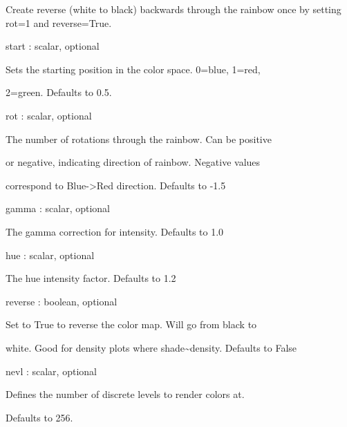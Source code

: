 \documentclass[a4paper,10pt,english]{sphinxmanual}
\begin{document}
\begin{fulllineitems}
Create reverse (white to black) backwards through the rainbow once
by setting rot=1 and reverse=True.
\begin{description}
\item[{Args:}] \leavevmode
\begin{DUlineblock}{0em}
\item[] start : scalar, optional
\item[]
\begin{DUlineblock}{\DUlineblockindent}
\item[] Sets the starting position in the color space. 0=blue, 1=red, 
\item[] 2=green. Defaults to 0.5.
\end{DUlineblock}
\item[] rot : scalar, optional
\item[]
\begin{DUlineblock}{\DUlineblockindent}
\item[] The number of rotations through the rainbow. Can be positive 
\item[]
\begin{DUlineblock}{\DUlineblockindent}
\item[] or negative, indicating direction of rainbow. Negative values
\item[] correspond to Blue-\textgreater{}Red direction. Defaults to -1.5
\end{DUlineblock}
\end{DUlineblock}
\item[] gamma : scalar, optional
\item[]
\begin{DUlineblock}{\DUlineblockindent}
\item[] The gamma correction for intensity. Defaults to 1.0        
\end{DUlineblock}
\item[] hue : scalar, optional
\item[]
\begin{DUlineblock}{\DUlineblockindent}
\item[] The hue intensity factor. Defaults to 1.2
\end{DUlineblock}
\item[] reverse : boolean, optional
\item[]
\begin{DUlineblock}{\DUlineblockindent}
\item[] Set to True to reverse the color map. Will go from black to
\item[] white. Good for density plots where shade\textasciitilde{}density. Defaults to False
\end{DUlineblock}
\item[] nevl : scalar, optional
\item[]
\begin{DUlineblock}{\DUlineblockindent}
\item[] Defines the number of discrete levels to render colors at.
\item[] Defaults to 256.
\end{DUlineblock}
\end{DUlineblock}


\end{description}
\end{fulllineitems}
\end{document}

